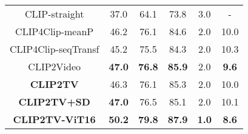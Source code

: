 \begin{table}[t]
\begin{minipage}{0.48\linewidth}
\begin{center}
{\begin{tabular}{c|ccccc}
    CLIP-straight \cite{portillo2021straightforward} & 37.0 & 64.1 & 73.8 & 3.0 & - \\
    CLIP4Clip-meanP \cite{luo2021clip4clip} & 46.2 & 76.1 & 84.6 & 2.0 & 10.0 \\
    CLIP4Clip-seqTransf \cite{luo2021clip4clip} & 45.2 & 75.5 & 84.3 & 2.0 & 10.3 \\
CLIP2Video \cite{fang2021clip2video} & \textbf{47.0} & \textbf{76.8} & \textbf{85.9} & 2.0 & \textbf{9.6} \\
    \hline
    \textbf{CLIP2TV} & 46.3 & 76.1 & 85.3 & 2.0 & 10.0 \\
    \textbf{CLIP2TV+SD} & \textbf{47.0} & 76.5 & 85.1 & 2.0 & 10.1 \\
    \hdashline
    \textbf{CLIP2TV-ViT16} & \textbf{50.2} & \textbf{79.8} & \textbf{87.9} & \textbf{1.0} & \textbf{8.6} \\
\hline
    \end{tabular}}
    \end{center}
    \end{minipage}
\end{table}

